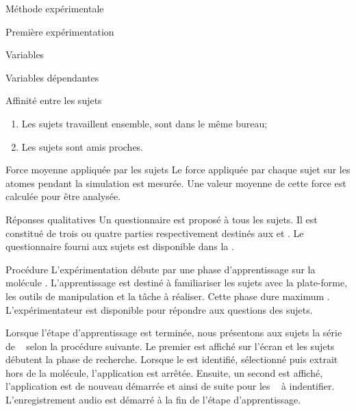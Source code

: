 \documentclass[myfrancais]{mythesis}
\begin{document}
\begin{mychapter}{Méthode expérimentale}
\begin{mysection}{Première expérimentation}
\begin{mysubsection}{Variables}
\begin{mysubsubsection}{Variables dépendantes}
\begin{myparagraph}{ Affinité entre les sujets}
\begin{enumerate}
							\item Les sujets travaillent ensemble, sont dans le même bureau;
							\item Les sujets sont amis proches.
						\end{enumerate}
					\end{myparagraph}
					\begin{myparagraph}{ Force moyenne appliquée par les sujets}
						Le force appliquée par chaque sujet sur les atomes pendant la simulation est mesurée.
						Une valeur moyenne de cette force est calculée pour être analysée.
					\end{myparagraph}
					\begin{myparagraph}{ Réponses qualitatives}
						Un questionnaire est proposé à tous les sujets.
						Il est constitué de trois ou quatre parties respectivement destinés aux  et .
						Le questionnaire fourni aux sujets est disponible dans la .
					\end{myparagraph}
				\end{mysubsubsection}
			\end{mysubsection}
			\begin{mysubsection}{Procédure}
				L'expérimentation débute par une phase d'apprentissage sur la molécule \myTRPZIPPER.
				L'apprentissage est destiné à familiariser les sujets avec la plate-forme, les outils de manipulation et la tâche à réaliser.
				Cette phase dure maximum .
				L'expérimentateur est disponible pour répondre aux questions des sujets.

				Lorsque l'étape d'apprentissage est terminée, nous présentons aux sujets la série de ~ selon la procédure suivante.
				Le premier  est affiché sur l'écran \myLCD et les sujets débutent la phase de recherche.
				Lorsque le  est identifié, sélectionné puis extrait hors de la molécule, l'application est arrêtée.
				Ensuite, un second  est affiché, l'application est de nouveau démarrée et ainsi de suite pour les ~ à indentifier.
				L'enregistrement audio est démarré à la fin de l'étape d'apprentissage.


\end{mysubsection}
\end{mysection}
\end{mychapter}
\end{document}
